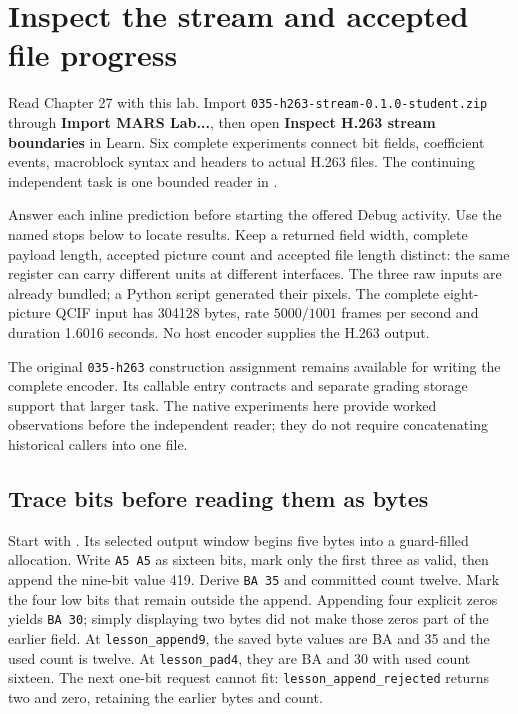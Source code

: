\chapter{Inspect the stream and accepted file progress}
\label{revision-lab:producing-video-streams}

Read Chapter 27 with this lab. Import
\texttt{035-h263-stream-0.1.0-student.zip} through
\textbf{Import MARS Lab...}, then open
\textbf{Inspect H.263 stream boundaries} in Learn. Six complete experiments
connect bit fields, coefficient events, macroblock syntax and headers to actual
H.263 files. The continuing independent task is one bounded reader in
.

Answer each inline prediction before starting the offered Debug activity. Use the
named stops below to locate results. Keep a returned field width, complete payload
length, accepted picture count and accepted file length distinct: the same register
can carry different units at different interfaces. The three raw inputs are
already bundled; a Python script generated their pixels. The complete eight-picture
QCIF input has 304128 bytes, rate $5000/1001$ frames per second and duration
1.6016 seconds. No host encoder supplies the H.263 output.

The original \texttt{035-h263} construction assignment remains available for
writing the complete encoder. Its callable entry contracts and separate grading
storage support that larger task. The native experiments here provide worked
observations before the independent reader; they do not require concatenating
historical callers into one file.

\section{Trace bits before reading them as bytes}

Start with . Its selected output window begins
five bytes into a guard-filled allocation. Write \texttt{A5 A5} as sixteen bits, mark only the first three as valid, then
append the nine-bit value 419. Derive \texttt{BA 35} and committed count twelve.
Mark the four low bits that remain outside the append. Appending four explicit
zeros yields \texttt{BA 30}; simply displaying two bytes did not make those
zeros part of the earlier field. At \texttt{lesson\_append9}, the saved byte
values are BA and 35 and the used count is twelve. At
\texttt{lesson\_pad4}, they are BA and 30 with used count sixteen. The next
one-bit request cannot fit: \texttt{lesson\_append\_rejected} returns two and
zero, retaining the earlier bytes and count.

